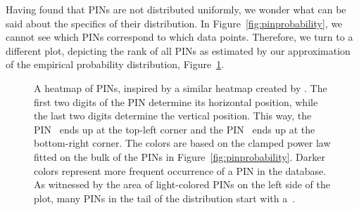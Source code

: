 \begin{example}
  Having found that PINs are not distributed uniformly, we wonder what can be said about the specifics of their distribution.
  In Figure~\ref{fig:pinprobability}, we cannot see which PINs correspond to which data points.
  Therefore, we turn to a different plot, depicting the rank of all PINs as estimated by our approximation of the empirical probability distribution, Figure~\ref{fig:pinheatmap}.
  \begin{figure}
    \centering
    \caption{
      A heatmap of PINs, inspired by a similar heatmap created by \textcite{berry2012pin}.
      The first two digits of the PIN determine its horizontal position, while the last two digits determine the vertical position.
      This way, the PIN~ ends up at the top-left corner and the PIN~ ends up at the bottom-right corner.
      The colors are based on the clamped power law fitted on the bulk of the PINs in Figure~\ref{fig:pinprobability}.
      Darker colors represent more frequent occurrence of a PIN in the database.
      As witnessed by the area of light-colored PINs on the left side of the plot, many PINs in the tail of the distribution start with a~.
    }
    \label{fig:pinheatmap}
  \end{figure}


\end{example}

